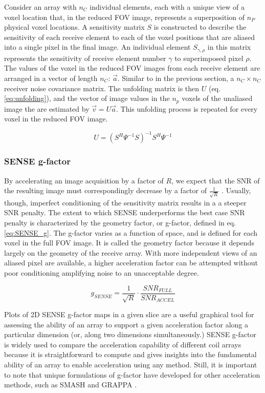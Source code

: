 Consider an array with $n_C$ individual elements, each with a unique view of a voxel location that, in the reduced FOV
image, represents a superposition of $n_P$ physical voxel locations. A sensitivity matrix $S$ is constructed to describe
the sensitivity of each receive element to each of the voxel positions that are aliased into a single pixel in the final
image. An individual element $S_{\gamma,\rho}$ in this matrix represents the sensitivity of receive element number
$\gamma$ to superimposed pixel $\rho$. The values of the voxel in the reduced FOV images from each receive element are
arranged in a vector of length $n_C$: $\vec{a}$. Similar to in the previous section, a $n_C \times n_C$ receiver noise covariance
matrix. The unfolding matrix is then $U$ (eq. \ref{eq:unfolding}), and the vector of image values in the $n_p$
voxels of the unaliased image the are estimated by $\vec{v} = U\vec{a}$. This unfolding process is repeated for every
voxel in the reduced FOV image.

\begin{equation}\label{eq:unfolding}
    U = (S^H\Psi^{-1}S)^{-1}S^H\Psi^{-1}
\end{equation}

\subsubsection{SENSE g-factor}
By accelerating an image acquisition by a factor of $R$, we expect that the SNR of the resulting image must
correspondingly decrease by a factor of $\frac{1}{\sqrt{R}}$ \cite{nishimura}. Usually, though, imperfect conditioning
of the sensitivity matrix results in a a steeper SNR penalty. The extent to which SENSE underperforms the best case SNR
penalty is characterized by the geometry factor, or g-factor, defined in eq. \ref{eq:SENSE_g}. The g-factor varies as a
function of space, and is defined for each voxel in the full FOV image. It is called the geometry factor because it
depends largely on the geometry of the receive array. With more independent views of an aliased pixel are available, a
higher acceleration factor can be attempted without poor conditioning amplifying noise to an unacceptable degree.

\begin{equation}\label{eq:SENSE_g}
    g_{SENSE} = \frac{1}{\sqrt{R}} \cdot \frac{SNR_{FULL}}{SNR_{ACCEL}}
\end{equation}

Plots of 2D SENSE g-factor maps in a given slice are a useful graphical tool for assessing the ability of an array to support
a given acceleration factor along a particular dimension (or, along two dimensions simultaneously.) SENSE g-factor is
widely used to compare the acceleration capability of different coil arrays because it is straightforward to compute and
gives insights into the fundamental ability of an array to enable acceleration using any method. Still, it is important
to note that unique formulations of g-factor have developed for other acceleration methods, such as SMASH and GRAPPA \cite{Breuer2009}.
